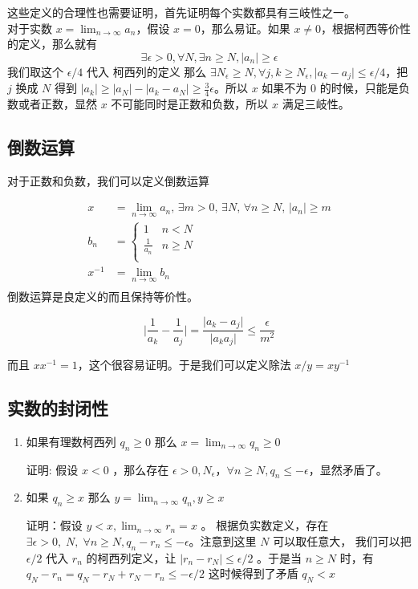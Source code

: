 这些定义的合理性也需要证明，首先证明每个实数都具有三岐性之一。\\
对于实数 $x = \lim_{n\to \infty} a_n$，假设 $x = 0$，那么易证。如果 $x \ne 0$，根据柯西等价性的定义，那么就有 
\[ \exists \epsilon > 0, \forall N , \exists n \ge N, \lvert a_n \rvert \ge \epsilon \]
我们取这个 $\epsilon / 4 $ 代入 柯西列的定义 那么 $\exists N_{\epsilon} \ge N , \forall j,k \ge N_{\epsilon}, \lvert a_k - a_j\rvert \le \epsilon / 4 $，把 $j$ 换成 $N$ 得到 
$\lvert a_k  \rvert \ge  \lvert a_N \rvert - \lvert a_k - a_N \rvert \ge \frac{3}{4} \epsilon $。所以 $x$ 如果不为 0 的时候，只能是负数或者正数，显然 $x$ 不可能同时是正数和负数，所以 $x$ 满足三岐性。

\subsection{倒数运算}

对于正数和负数，我们可以定义倒数运算 

\begin{align*}
x & = \lim_{n \to \infty} a_n,\, \exists m > 0,\, \exists N,\, \forall n \ge N,\, \lvert a_n \rvert \ge m \\
b_n & = 
\begin{cases}
1 & n < N \\
\frac{1}{a_n} & n \ge N \\
\end{cases} \\
x^{-1} & = \lim_{n \to \infty} b_n \\
\end{align*}
倒数运算是良定义的而且保持等价性。

\[
\lvert \frac{1}{a_k} - \frac{1}{a_j} \rvert = \frac{\lvert a_k - a_j \rvert}{\lvert a_ka_j \rvert} \le \frac{\epsilon}{m^2}
\]

而且 $xx^{-1} = 1$，这个很容易证明。于是我们可以定义除法 $x / y = xy^{-1}$

\subsection{实数的封闭性}

\begin{enumerate}
    \item 如果有理数柯西列 $q_n \ge 0$ 那么 $x = \lim_{n \to \infty} q_n \ge 0$

    证明: 假设 $x < 0$ ，那么存在 $\epsilon > 0 , N_{\epsilon}$，$\forall n \ge N, q_n \le -\epsilon $，显然矛盾了。\\

    \item 如果 $q_n \ge x$ 那么 $y = \lim_{n \to \infty} q_n, y \ge x$


证明：假设 $y < x, \lim_{n \to \infty} r_n = x$ 。
根据负实数定义，存在 $ \exists \epsilon > 0, \;N, \; \forall n \ge N,  q_n - r_n  \le -\epsilon $。注意到这里 $N$ 可以取任意大，
我们可以把 $ \epsilon / 2$ 代入 $r_n$ 的柯西列定义，让 $ \lvert r_n - r_N \rvert \le \epsilon /2$ 。于是当 $n \ge N$ 时，有 $q_N - r_n = q_N - r_N + r_N - r_n \le - \epsilon / 2$
这时候得到了矛盾 $q_N < x$
\end{enumerate}





